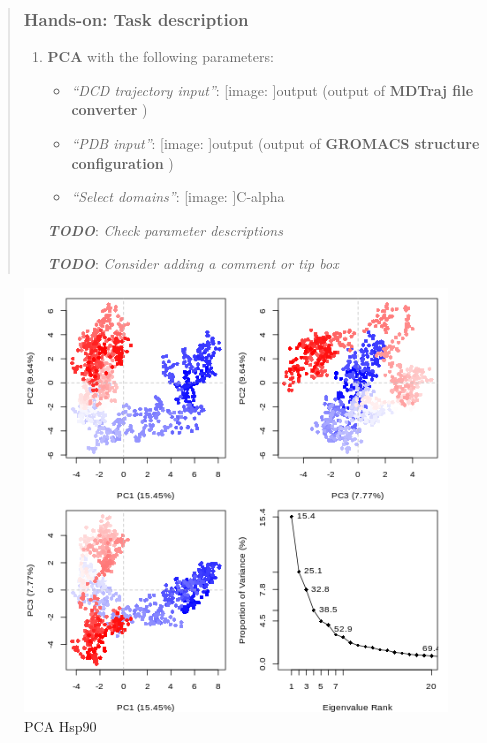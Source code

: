\documentclass[twocolumn]{bmcart}%
\def\texttt{[image: ]}
\providecommand{\tightlist}{%
  \setlength{\itemsep}{0pt}\setlength{\parskip}{0pt}}
\begin{document}
\begin{quote}
\hypertarget{hands-on-task-description-13}{%
\subsubsection{Hands-on: Task
description}\label{hands-on-task-description-13}}

\begin{enumerate}
\def\labelenumi{\arabic{enumi}.}
\tightlist
\item
  \textbf{PCA} with the following parameters:

  \begin{itemize}
  \tightlist
  \item
    \emph{``DCD trajectory input''}: \texttt{output} (output of
    \textbf{MDTraj file converter} )
  \item
    \emph{``PDB input''}: \texttt{output} (output of \textbf{GROMACS
    structure configuration} )
  \item
    \emph{``Select domains''}: \texttt{C-alpha}
  \end{itemize}

  \textbf{\emph{TODO}}: \emph{Check parameter descriptions}

  \textbf{\emph{TODO}}: \emph{Consider adding a comment or tip box}
\end{enumerate}


\end{quote}


\begin{figure}
\centering
\includegraphics{images/htmd_analysis_pca.png}
\caption{PCA Hsp90}
\end{figure}
\end{document}
